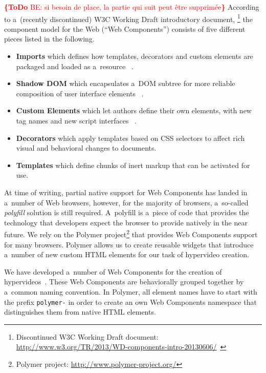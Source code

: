 \documentclass[conference]{IEEEtran}
\newcommand{\todo}[1]{\noindent\textcolor{red}{{\bf \{ToDo} #1{\bf \}}}}
\begin{document}
\todo{BE: si besoin de place, la partie qui suit peut être supprimée}
According to a~(recently discontinued) W3C Working Draft introductory document,%
\footnote{Discontinued W3C Working Draft document:
\url{http://www.w3.org/TR/2013/WD-components-intro-20130606/}~\cite{cooney2013Webcomponents}}
the component model for the Web (``Web Components'') consists of five different pieces
listed in the following.

\begin{itemize}
  \item \textbf{Imports} which defines how templates, decorators and custom elements are packaged and loaded as a~resource%
  ~\cite{glazkov2014htmlimports}.
  \item \textbf{Shadow DOM} which encapsulates a~DOM subtree for more reliable composition of user interface elements%
  ~\cite{glazkov2014shadowdom}.    
  \item \textbf{Custom Elements} which let authors define their own elements, with new tag names and new script interfaces%
  ~\cite{glazkov2013customelements}.  
  \item \textbf{Decorators} which apply templates based on CSS selectors to affect rich visual and behavioral changes to documents.
  \item \textbf{Templates} which define chunks of inert markup that can be activated for use.  
\end{itemize}

\noindent At time of writing, partial native support for Web Components
has landed in a~number of Web browsers,
however, for the majority of browsers,
a~so-called \emph{polyfill} solution is still required.
A~polyfill  is a~piece of code that provides the technology
that developers expect the browser to provide natively in the near future.
We rely on the Polymer project\footnote{Polymer project:
\url{http://www.polymer-project.org/}}
that provides Web Components support for many browsers.
Polymer allows us to create reusable widgets that introduce a~number of new
custom HTML elements for our task of hypervideo creation.

We have developed a~number of Web Components for the creation of hypervideos~\cite{steiner2014hypervideo}.
These Web Components are behaviorally grouped together
by a~common naming convention.
In Polymer, all element names have to start with the prefix \texttt{polymer-}
in order to create an own Web Components namespace
that distinguishes them from native HTML elements.
\end{document}
